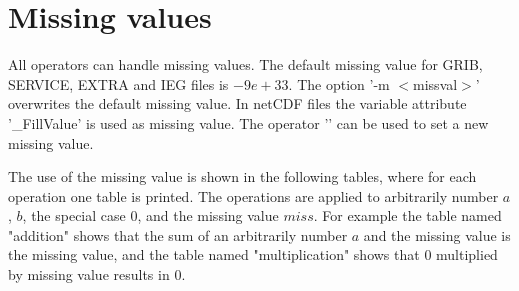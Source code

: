 \section{Missing values}

All operators can handle missing values.
The default missing value for GRIB, SERVICE, EXTRA and IEG files is $-9e+33$. 
The \CDO option '-m $<$missval$>$' overwrites the default missing value.
In netCDF files the variable attribute '\_FillValue' is used as missing value.
The operator '' can be used to set a new missing value.

The use of the missing value is shown in the following tables,
where for each operation one table is printed.
The operations are applied to arbitrarily number $a$, $b$, the special case $0$,
and the missing value $miss$.
For example the table named "addition" shows that the sum of an
arbitrarily number $a$ and the missing value is the missing value,
and the table named "multiplication" shows that $0$ multiplied by missing
value results in $0$.


